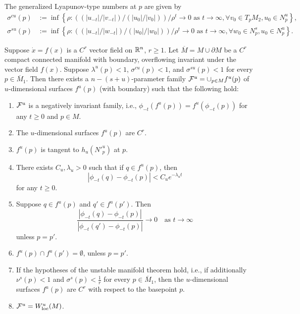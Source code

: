 \begin{defn}
	The generalized Lyapunov-type numbers at \(p\) are given by
	\begin{align}
		\sigma^{cu}(p) &:= \inf \left\{ \rho :( (|u_{-t}| / |v_{-t}|) / (|u_0| / |v_0|))/ \rho^t \to 0 \text{ as } t\to\infty , \forall v_0 \in T_pM_2 , u_0 \in N^u_p \right\}, \\
		\sigma^{su}(p) &:= \inf \left\{ \rho :( (|u_{-t}| / |w_{-t}|) / (|u_0| / |w_0|)) / \rho^t \to 0 \text{ as } t\to\infty , \forall w_0 \in N^s_p , u_0 \in N^u_p \right\} .
	\end{align}
\end{defn}
\begin{theorem}\label{foliation-of-unstable-manifold}
	Suppose \(\dot x = f(x) \) is a \(C^r\) vector field on \(\mathbb{R}^n\), \(r\geq 1\). Let \(\overline M = M \cup \partial M\) be a \(C^r\) compact connected manifold with boundary, overflowing invariant under the vector field \(f(x)\). Suppose \(\lambda^u(p)< 1\), \(\sigma^{cu}(p) < 1\), and \(\sigma^{su}(p) < 1\) for every \(p \in \overline M_1\). Then there exists a \(n-(s+u)\)-parameter family \(\mathcal{F}^u = \cup_{p\in M} f^u(p)\) of \(u\)-dimensional surfaces \(f^u(p)\) (with boundary) such that the following hold:
	\begin{enumerate}
		\item \(\mathcal{F}^u\) is a negatively invariant family, i.e., \(\phi_{-t} (f^u(p)) = f^u(\phi_{-t}(p))\) for any \(t\geq 0\) and \(p\in M\).
		\item The \(u\)-dimensional surfaces \(f^u(p)\) are \(C^r\).
		\item \(f^u(p)\) is tangent to \(h_u(N'^u_p)\) at \(p\).
		\item There exists \(C_u,\lambda_u > 0\) such that if \(q\in f^u(p)\), then \[| \phi_{-t}(q) - \phi_{-t}(p) | < C_u e^{-\lambda_u t}\] for any \(t\geq 0\).
		\item Suppose \(q\in f^u(p)\) and \(q'\in f^u(p')\). Then \[\frac{|\phi_{-t}(q) - \phi_{-t}(p) |}{| \phi_{-t}(q') - \phi_{-t}(p) |} \to 0 \quad \text{as } t\to\infty\] unless \(p = p'\).
		\item \(f^u(p) \cap f^u(p') = \emptyset \), unless \(p=p'\).
		\item If the hypotheses of the unstable manifold theorem hold, i.e., if additionally \(\nu^s(p) < 1\) and \(\sigma^s(p) < \frac 1 r\) for every \(p \in \overline M_1\), then the \(u\)-dimensional surfaces \(f^u(p)\) are \(C^r\) with respect to the basepoint \(p\).
		\item \(\mathcal{F}^u = W_{\mathrm{loc}}^u(M)\).
	\end{enumerate}
\end{theorem}

